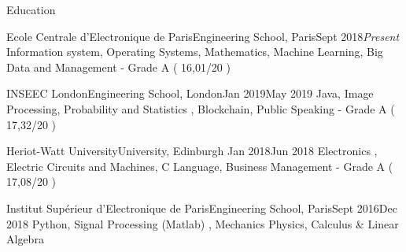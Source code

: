 \documentclass{resume}
\begin{document}
	\begin{rSection}{Education}
		\begin{school}{Ecole Centrale d'Electronique de Paris}{Engineering School, Paris}{Sept 2018}{\em Present}{
			Information system, Operating Systems, Mathematics, Machine Learning, Big Data and Management  - Grade A ( 16,01/20 )
		}
		\end{school}

		\begin{school}{INSEEC London}{Engineering School, London}{Jan 2019}{May 2019}{
			Java, Image Processing, Probability and Statistics , Blockchain, Public Speaking - Grade A ( 17,32/20 )
		}
		\end{school}
		
		\begin{school}{Heriot-Watt University}{University, Edinburgh }{Jan 2018}{Jun 2018}{
			Electronics , Electric Circuits and Machines, C Language, Business Management - Grade A ( 17,08/20 )
		}
		\end{school}

		\begin{school}{Institut Supérieur d'Electronique de Paris}{Engineering School, Paris}{Sept 2016}{Dec 2018}{
			Python, Signal Processing (Matlab) , Mechanics Physics, Calculus \& Linear Algebra
		}
		\end{school}
	\end{rSection}
\end{document}
